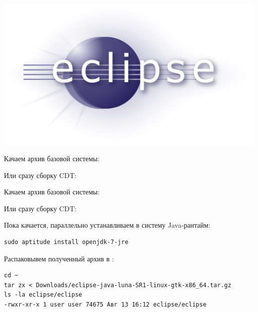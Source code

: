 \secrel{\eclipse}\label{eclipse}\secdown

\includegraphics[height=0.5\textheight]{logo/eclipse.png}



Качаем архив базовой системы:

Или сразу сборку CDT\eclipse:



Качаем архив базовой системы:

Или сразу сборку CDT\eclipse:

\bigskip

Пока качается, параллельно устанавливаем в систему Java-рантайм:

\begin{verbatim}
sudo aptitude install openjdk-7-jre
\end{verbatim}

Распаковывем полученный архив
в :

\begin{verbatim}
cd ~
tar zx < Downloads/eclipse-java-luna-SR1-linux-gtk-x86_64.tar.gz
ls -la eclipse/eclipse
-rwxr-xr-x 1 user user 74675 Авг 13 16:12 eclipse/eclipse
\end{verbatim}

